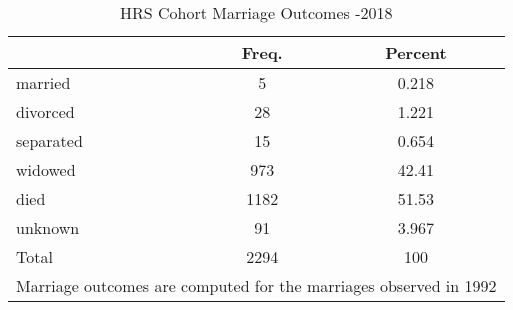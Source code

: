 \begin{table}[htbp]\centering
\def\sym#1{\ifmmode^{#1}\else\(^{#1}\)\fi}
\caption{HRS Cohort Marriage Outcomes -2018}
\begin{tabular}{l*{1}{cc}}
\hline\hline
            &       Freq.&     Percent\\
\hline
married     &           5&       0.218\\
divorced    &          28&       1.221\\
separated   &          15&       0.654\\
widowed     &         973&       42.41\\
died        &        1182&       51.53\\
unknown     &          91&       3.967\\
Total       &        2294&         100\\
\hline\hline
\multicolumn{3}{l}{\footnotesize Marriage outcomes are computed for the marriages observed in 1992}\\
\end{tabular}
\end{table}
